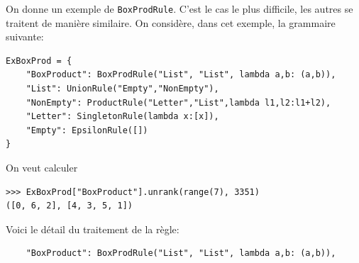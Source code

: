 \documentclass[11pt]{article}
\newcommand{\BoxProdRule}{\texttt{BoxProdRule}\xspace}
\begin{document}
\begin{itemize}
On donne un exemple de \BoxProdRule. C'est le cas le plus difficile, les
autres se traitent de manière similaire. On considère, dans cet exemple, la
grammaire suivante:
\medskip

\begin{verbatim}
ExBoxProd = {
    "BoxProduct": BoxProdRule("List", "List", lambda a,b: (a,b)),
    "List": UnionRule("Empty","NonEmpty"),
    "NonEmpty": ProductRule("Letter","List",lambda l1,l2:l1+l2),
    "Letter": SingletonRule(lambda x:[x]),
    "Empty": EpsilonRule([])
}
\end{verbatim}
\bigskip

On veut calculer
\begin{verbatim}
>>> ExBoxProd["BoxProduct"].unrank(range(7), 3351)
([0, 6, 2], [4, 3, 5, 1])
\end{verbatim}
\bigskip

Voici le détail du traitement de la règle:
\begin{verbatim}
    "BoxProduct": BoxProdRule("List", "List", lambda a,b: (a,b)),
\end{verbatim}


\end{itemize}
\end{document}
